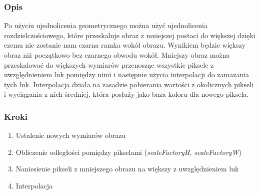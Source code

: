 \documentclass[a4paper,12pt]{book}
\begin{document}
\subsubsection*{Opis}
Po użyciu ujednolicenia geometrycznego można użyć ujednolicenia rozdzielczościowego, które przeskaluje obraz z mniejszej postaci do większej dzięki czemu nie zostanie nam czarna ramka wokół obrazu. Wynikiem będzie większy obraz niż początkowo bez czarnego obwodu wokół. 
Mniejszy obraz można przeskalować do większych wymiarów przenosząc wszystkie piksele z uwzględnieniem luk pomiędzy nimi i następnie użycia interpolacji do zamazania tych luk. 
Interpolacja działa na zasadzie pobierania wartości z okolicznych pikseli i wyciągania z nich średniej, która posłuży jako baza koloru dla nowego piksela. 

\subsubsection*{Kroki}
\begin{enumerate}
	\item Ustalenie nowych wymiarów obrazu
	\item Obliczenie odległości pomiędzy pikselami (\textit{scaleFactoryH, scaleFactoryW})
	\item Naniesienie pikseli z mniejszego obrazu na większy z uwzględnieniem luk
	\item Interpolacja
\end{enumerate}
\end{document}
